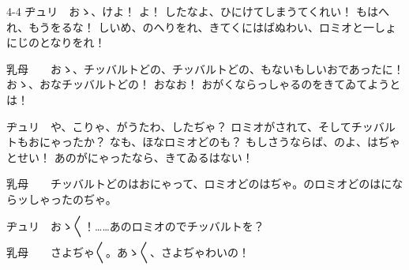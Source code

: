 \documentclass[tate,paper=b6j,jafontsize=9pt]{jlreq}
\begin{document}
\begin{azconvIndented}{4\zw}{-4\zw}
ヂュリ　おゝ、けよ！ よ！ したなよ、ひにけてしまうてくれい！ もはへれ、もうをるな！ しいめ、のへりをれ、きてくにはばぬわい、ロミオと一しょにじのとなりをれ！

乳母　　おゝ、チッバルトどの、チッバルトどの、もないもしいおであったに！ おゝ、おなチッバルトどの！ おなお！ おがくならっしゃるのをきてゐてようとは！

ヂュリ　や、こりゃ、がうたわ、したぢゃ？ ロミオがされて、そしてチッバルトもおにゃったか？ なも、ほなロミオどのも？ もしさうならば、のよ、はぢゃとせい！ あのがにゃったなら、きてゐるはない！

乳母　　チッバルトどのはおにゃって、ロミオどのはぢゃ。のロミオどのはにならッしゃったのぢゃ。

ヂュリ　おゝ{〳〵}！……あのロミオのでチッバルトを？

乳母　　さよぢゃ{〳〵}。あゝ{〳〵}、さよぢゃわいの！


\end{azconvIndented}
\end{document}
